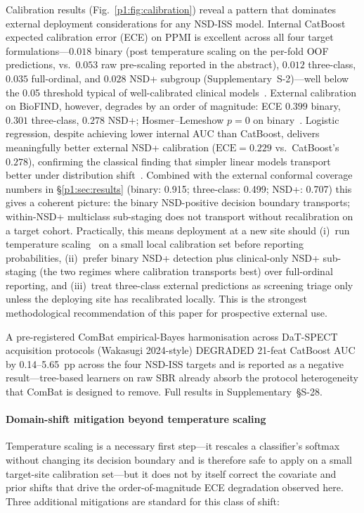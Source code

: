 Calibration results (Fig.~\ref{p1:fig:calibration}) reveal a pattern that dominates external deployment considerations for any NSD-ISS model. Internal CatBoost expected calibration error (ECE) on PPMI is excellent across all four target formulations---$0.018$ binary (post temperature scaling on the per-fold OOF predictions, vs.\ $0.053$ raw pre-scaling reported in the abstract), $0.012$ three-class, $0.035$ full-ordinal, and $0.028$ NSD+ subgroup (Supplementary~S-2)---well below the 0.05 threshold typical of well-calibrated clinical models~\cite{guo2017calibration}. External calibration on BioFIND, however, degrades by an order of magnitude: ECE $0.399$ binary, $0.301$ three-class, $0.278$ NSD+; Hosmer--Lemeshow $p{=}0$ on binary~\cite{naeini2015ece}. Logistic regression, despite achieving lower internal AUC than CatBoost, delivers meaningfully better external NSD+ calibration ($\mathrm{ECE}{=}0.229$ vs.\ CatBoost's $0.278$), confirming the classical finding that simpler linear models transport better under distribution shift~\cite{austin2020graphical}. Combined with the external conformal coverage numbers in \S\ref{p1:sec:results} (binary: 0.915; three-class: 0.499; NSD+: 0.707) this gives a coherent picture: the binary NSD-positive decision boundary transports; within-NSD+ multiclass sub-staging does not transport without recalibration on a target cohort. Practically, this means deployment at a new site should (i)~run temperature scaling~\cite{guo2017calibration} on a small local calibration set before reporting probabilities, (ii)~prefer binary NSD+ detection plus clinical-only NSD+ sub-staging (the two regimes where calibration transports best) over full-ordinal reporting, and (iii)~treat three-class external predictions as screening triage only unless the deploying site has recalibrated locally. This is the strongest methodological recommendation of this paper for prospective external use.

A pre-registered ComBat empirical-Bayes harmonisation across DaT-SPECT acquisition protocols (Wakasugi 2024-style) DEGRADED 21-feat CatBoost AUC by 0.14--5.65~pp across the four NSD-ISS targets and is reported as a negative result---tree-based learners on raw SBR already absorb the protocol heterogeneity that ComBat is designed to remove. Full results in Supplementary~\S{}S-28.

\paragraph*{Domain-shift mitigation beyond temperature scaling} Temperature scaling is a necessary first step---it rescales a classifier's softmax without changing its decision boundary and is therefore safe to apply on a small target-site calibration set---but it does not by itself correct the covariate and prior shifts that drive the order-of-magnitude ECE degradation observed here. Three additional mitigations are standard for this class of shift:

